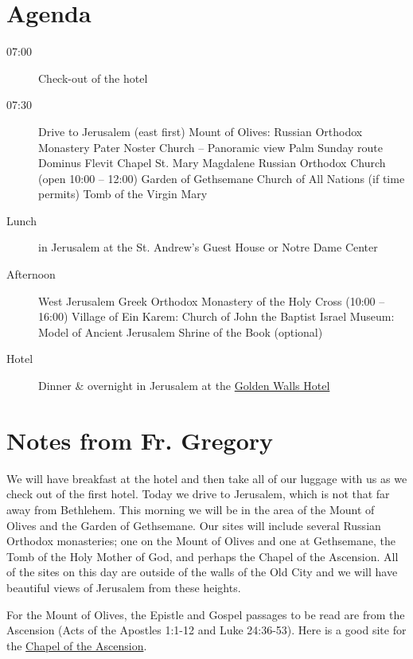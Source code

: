 \documentclass[letterpaper]{report}
\begin{document}
\section{Agenda}
\begin{description}
	\item[07:00] Check-out of the hotel
 \item[07:30] Drive to Jerusalem (east first)
	    \subitem Mount of Olives: Russian Orthodox Monastery
	    \subitem Pater Noster Church -- Panoramic view
	    \subitem Palm Sunday route
	    \subitem Dominus Flevit Chapel
	    \subitem St. Mary Magdalene Russian Orthodox Church
	        (open 10:00 – 12:00)
	    \subitem Garden of Gethsemane
	    \subitem Church of All Nations (if time permits)
	    \subitem Tomb of the Virgin Mary
	\item[Lunch] in Jerusalem at the
			St. Andrew’s Guest House or Notre Dame Center
	\item[Afternoon] West Jerusalem
	    \subitem Greek Orthodox Monastery of the Holy Cross (10:00 – 16:00)
		\subitem Village of Ein Karem: Church of John the Baptist 
		\subitem Israel Museum: Model of Ancient Jerusalem
		\subitem Shrine of the Book (optional)
	\item[Hotel] Dinner \& overnight in Jerusalem at the
	    \href{http://goldenwalls.com/}{Golden Walls Hotel}
\end{description}

\section{Notes from Fr. Gregory}
We will have breakfast at the hotel and then take all of our luggage with us 
as we check out of the first hotel.
Today we drive to Jerusalem, which is not that far away from Bethlehem.
This morning we will be in the area of the Mount of Olives and the Garden of
Gethsemane.
Our sites will include several Russian Orthodox monasteries;
one on the Mount of Olives and one at Gethsemane,
the Tomb of the Holy Mother of God,
and perhaps the Chapel of the Ascension.
All of the sites on this day are outside of the walls of the Old City and we
will have beautiful views of Jerusalem from these heights.

For the Mount of Olives, the Epistle and Gospel passages to be read are from
the Ascension (Acts of the Apostles 1:1-12 and Luke 24:36-53).
Here is a good site for the 
\href{http://www.sacred-destinations.com/israel/jerusalem-chapel-of-ascension}{
    Chapel of the Ascension}.
\end{document}
